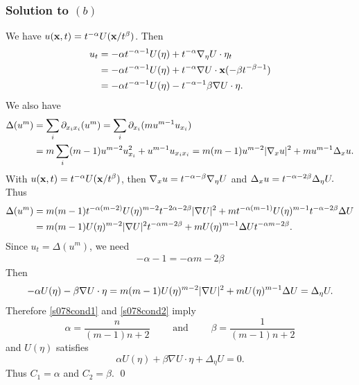 \subsubsection*{Solution to $(b)$}
We have $u(\mathbf{x}, t) = t^{-\alpha}U(\mathbf{x}/t^{\beta})$. Then
\begin{align*}
u_{t} &= -\alpha t^{-\alpha - 1}U(\eta) + t^{-\alpha}\nabla_{\eta}U \cdot \eta_{t}\\
& = -\alpha t^{-\alpha - 1}U(\eta) + t^{-\alpha}\nabla U \cdot \mathbf{x}(-\beta t^{-\beta - 1})\\
& = -\alpha t^{-\alpha - 1}U(\eta) - t^{-\alpha - 1}\beta \nabla U \cdot \eta.
\end{align*}
We also have
\begin{align*}
\Delta(u^{m}) &= \sum_{i}\partial_{x_{i}x_{i}}(u^{m}) = \sum_{i}\partial_{x_{i}}(mu^{m - 1}u_{x_{i}})\\
& = m\sum_{i}(m - 1)u^{m - 2}u_{x_{i}}^{2} + u^{m - 1}u_{x_{i}x_{i}} = m(m - 1)u^{m - 2}|\nabla_{x}u|^{2} + mu^{m - 1}\Delta_{x}u.
\end{align*}
With $u(\mathbf{x}, t) = t^{-\alpha}U(\mathbf{x}/t^{\beta})$, then
$\nabla_{x}u = t^{-\alpha - \beta}\nabla_{\eta}U$ and $\Delta_{x}u = t^{-\alpha - 2\beta}\Delta_{\eta}U.$
Thus
\begin{align*}
\Delta(u^{m}) &= m(m - 1)t^{-\alpha(m - 2)}U(\eta)^{m - 2}t^{-2\alpha - 2\beta}|\nabla U|^{2} + mt^{-\alpha(m - 1)}U(\eta)^{m - 1}t^{-\alpha- 2\beta}\Delta U\\
&= m(m - 1)U(\eta)^{m - 2}|\nabla U|^{2}t^{-\alpha m - 2\beta} + mU(\eta)^{m - 1}\Delta U t^{-\alpha m - 2\beta}.
\end{align*}
Since $u_{t} = \Delta(u^{m})$, we need
\begin{align}\label{s078cond2}
-\alpha - 1 = -\alpha m - 2\beta
\end{align}
Then
\begin{align*}
-\alpha U(\eta) - \beta \nabla U \cdot \eta = m(m - 1)U(\eta)^{m - 2}|\nabla U|^{2} + mU(\eta)^{m - 1}\Delta U = \Delta_{\eta}U.
\end{align*}
Therefore \eqref{s078cond1} and \eqref{s078cond2} imply $$\alpha = \frac{n}{(m - 1)n + 2}\quad\quad \text{ and } \quad\quad \beta = \frac{1}{(m - 1)n + 2}$$
and $U(\eta)$ satisfies
$$\alpha U(\eta) + \beta\nabla U \cdot \eta + \Delta_{\eta}U = 0.$$
Thus $C_{1} = \alpha$ and $C_{2} = \beta$.
\hfill\qed

